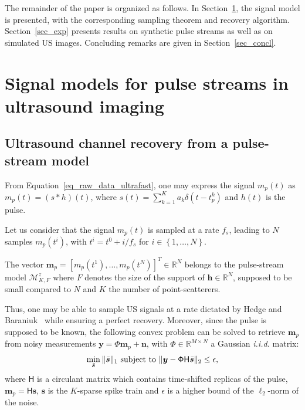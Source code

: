 \documentclass{article}
\newcommand{\vect}[1]{\bm{#1}}
\newcommand{\mat}[1]{\mathsf{#1}}
\newcommand{\ser}[2]{#1^{#2}}
\theoremstyle{definition}
\begin{document}
The remainder of the paper is organized as follows. In Section~\ref{sec_pulsestreams_US}, the signal model is presented, with the corresponding sampling theorem and recovery algorithm. Section~\ref{sec_exp} presents results on synthetic pulse streams as well as on simulated US images. Concluding remarks are given in Section~\ref{sec_concl}.

\section{Signal models for pulse streams in ultrasound imaging}
\label{sec_pulsestreams_US}
\subsection{Ultrasound channel recovery from a pulse-stream model}
\label{subsec_US_pulsestream}
From Equation~\eqref{eq_raw_data_ultrafast}, one may express the signal $m_p\left(t\right)$ as $m_p\left(t\right) = \left(s \ast h\right)\left(t\right)$, where $s \left(t\right) = \sum \limits_{k=1}^{K} a_k \delta\left(t - \ser{t_p}{k}\right)$ and $h\left(t\right)$ is the pulse. 

Let us consider that the signal $m_p \left(t\right)$ is sampled at a rate $f_s$, leading to $N$ samples $ m_p \left(\ser{t}{i}\right)$, with $\ser{t}{i}= \ser{t}{0} + i/f_s$ for $i \in \left\lbrace 1,\dots,N \right\rbrace$.

The vector $\vect{m}_p = \left[m_p\left(\ser{t}{1}\right),\dots,m_p\left(\ser{t}{N}\right)\right]^T \in \mathbb{R}^N$ belongs to the pulse-stream model $\mathcal{M}^z_{K,F}$ where $F$ denotes the size of the support of $\vect{h} \in \mathbb{R}^N$, supposed to be small compared to $N$ and $K$ the number of point-scatterers.

Thus, one may be able to sample US signals at a rate dictated by Hedge and Baraniuk~\cite{Hedge_TSP_2011} while ensuring a perfect recovery. Moreover, since the pulse is supposed to be known, the following convex problem can be solved to retrieve $\vect{m}_p$ from noisy measurements $\vect{y} = \mathsf{\Phi} \vect{m}_p + \vect{n}$, with $\mathsf{\Phi} \in \mathbb{R}^{M \times N}$ a Gaussian \textit{i.i.d.} matrix:
\begin{equation}
\label{eq_l1_BPDN}
\min_{\bar{\vect{s}}}\|\bar{\vect{s}}\|_{1}
\textnormal{ subject to }\| \bm{y}-\mat{\Phi H}\bar{\vect{s}}\|_{2}\leq\epsilon,
\end{equation}
where $\mat{H}$ is a circulant matrix which contains time-shifted replicas of the pulse, $\vect{m}_p = \mat{H} \vect{s}$, $\vect{s}$ is the $K$-sparse spike train and $\epsilon$ is a higher bound of the $\ell_2$-norm of the noise.
\end{document}
